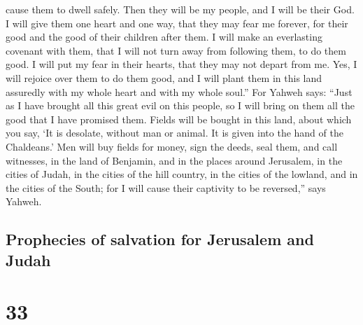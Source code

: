 cause them to dwell safely.  Then they will be my people,
and I will be their God.  I will give them one heart and
one way, that they may fear me forever, for their good and the good of
their children after them.  I will make an everlasting
covenant with them, that I will not turn away from following them, to do
them good. I will put my fear in their hearts, that they may not depart
from me.  Yes, I will rejoice over them to do them good,
and I will plant them in this land assuredly with my whole heart and
with my whole soul.''  For Yahweh says: ``Just as I have
brought all this great evil on this people, so I will bring on them all
the good that I have promised them.  Fields will be
bought in this land, about which you say, `It is desolate, without man
or animal. It is given into the hand of the Chaldeans.' 
Men will buy fields for money, sign the deeds, seal them, and call
witnesses, in the land of Benjamin, and in the places around Jerusalem,
in the cities of Judah, in the cities of the hill country, in the cities
of the lowland, and in the cities of the South; for I will cause their
captivity to be reversed,'' says Yahweh.

\hypertarget{prophecies-of-salvation-for-jerusalem-and-judah}{%
\subsection{Prophecies of salvation for Jerusalem and
Judah}\label{prophecies-of-salvation-for-jerusalem-and-judah}}

\hypertarget{section-32}{%
\section{33}\label{section-32}}

